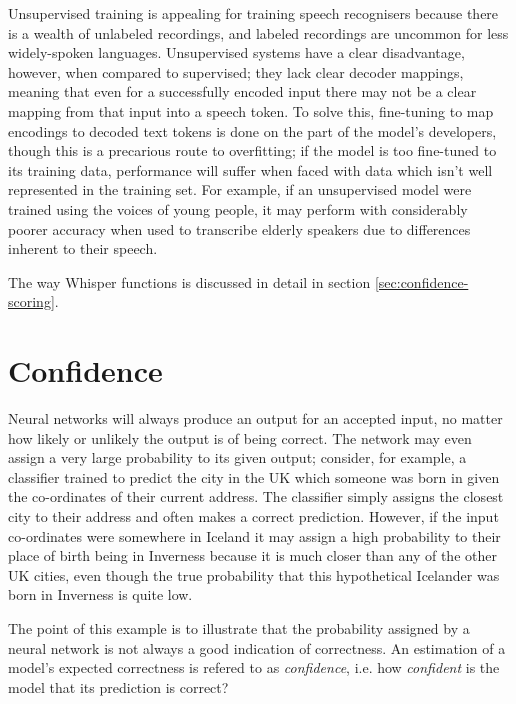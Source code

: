 Unsupervised training is appealing for training speech recognisers because there is a wealth of unlabeled recordings, and labeled recordings are uncommon for less widely-spoken languages\cite{baevski2021}.
Unsupervised systems have a clear disadvantage, however, when compared to supervised; they lack clear decoder mappings\cite{whisper}, meaning that even for a successfully encoded input there may not be a clear mapping from that input into a speech token.
To solve this, fine-tuning to map encodings to decoded text tokens is done on the part of the model's developers, though this is a precarious route to overfitting;
if the model is too fine-tuned to its training data, performance will suffer when faced with data which isn't well represented in the training set.
For example, if an unsupervised model were trained using the voices of young people, it may perform with considerably poorer accuracy when used to transcribe elderly speakers due to differences inherent to their speech\cite{Horton2010}.

The way Whisper functions is discussed in detail in section \ref{sec:confidence-scoring}.

\section{Confidence}
Neural networks will always produce an output for an accepted input, no matter how likely or unlikely the output is of being correct.
The network may even assign a very large probability to its given output; consider, for example, a classifier trained to predict the city in the UK which someone was born in given the co-ordinates of their current address.
The classifier simply assigns the closest city to their address and often makes a correct prediction.
However, if the input co-ordinates were somewhere in Iceland it may assign a high probability to their place of birth being in Inverness because it is much closer than any of the other UK cities, even though the true probability that this hypothetical Icelander was born in Inverness is quite low.

The point of this example is to illustrate that the probability assigned by a neural network is not always a good indication of correctness.
An estimation of a model's expected correctness is refered to as \emph{confidence}, i.e. how \emph{confident} is the model that its prediction is correct?



